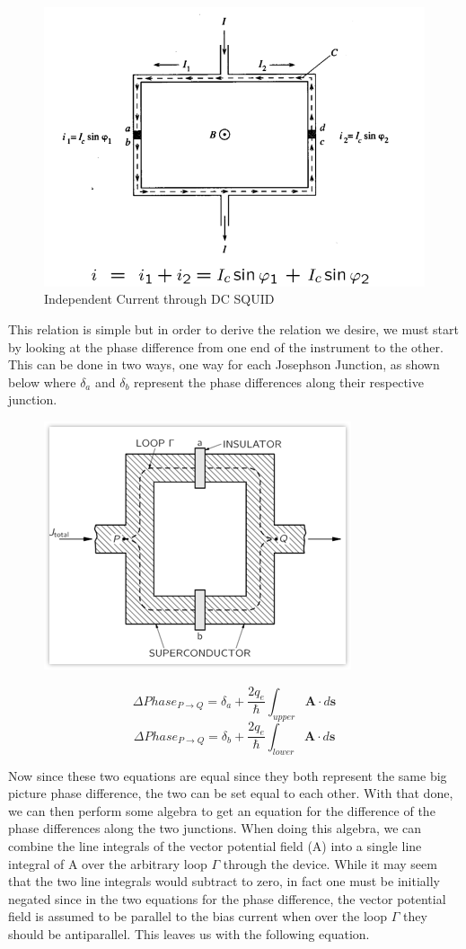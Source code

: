 \documentclass[conf]{new-aiaa}
\begin{document}
\begin{figure}[!h]
    \centering
    \includegraphics[width = .6\linewidth]{NoFlux.PNG}
    \caption{Independent Current through DC SQUID}
\end{figure}

This relation is simple but in order to derive the relation we desire, we must start by looking at the phase difference from one end of the instrument to the other. This can be done in two ways, one way for each Josephson Junction, as shown below where \(\delta_{a}\) and \(\delta_{b}\) represent the phase differences along their respective junction.

\begin{figure}[!h]
    \centering
    \includegraphics[width = .3\linewidth]{Loop.png}
\end{figure}

$$\Delta Phase_{P\rightarrow Q} = \delta_{a} + \frac{2q_{e}}{\hbar} \int_{upper} \boldsymbol A \cdot d\boldsymbol s$$
$$\Delta Phase_{P\rightarrow Q} = \delta_{b} + \frac{2q_{e}}{\hbar} \int_{lower} \boldsymbol A \cdot d\boldsymbol s$$

Now since these two equations are equal since they both represent the same big picture phase difference, the two can be set equal to each other. With that done, we can then perform some algebra to get an equation for the difference of the phase differences along the two junctions. When doing this algebra, we can combine the line integrals of the vector potential field (\boldsymbol A) into a single line integral of \boldsymbol A over the arbitrary loop \(\Gamma\) through the device. While it may seem that the two line integrals would subtract to zero, in fact one must be initially negated since in the two equations for the phase difference, the vector potential field is assumed to be parallel to the bias current when over the loop \(\Gamma\) they should be antiparallel. This leaves us with the following equation. 
\end{document}

